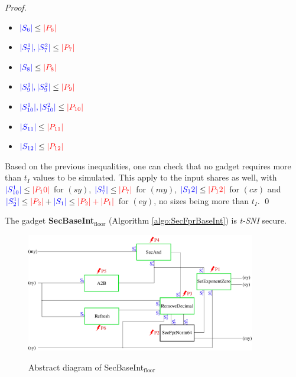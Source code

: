 \documentclass[runningheads]{llncs}
\begin{document}
\begin{proof}
\begin{multicols}{2}
\begin{itemize}
      \item $\textcolor{blue}{|S_6|} \leq \textcolor{red}{|P_6|}$
      \item $\textcolor{blue}{|S_7^1|,|S_7^2|} \leq \textcolor{red}{|P_7|}$
      \item $\textcolor{blue}{|S_8|} \leq \textcolor{red}{|P_8|}$
      \item $\textcolor{blue}{|S_9^1|,|S_9^2|} \leq \textcolor{red}{|P_9|}$
      \item $\textcolor{blue}{|S_{10}^1|,|S_{10}^2|} \leq \textcolor{red}{|P_{10}|}$
      \item $\textcolor{blue}{|S_{11}|} \leq \textcolor{red}{|P_{11}|}$
      \item $\textcolor{blue}{|S_{12}|} \leq \textcolor{red}{|P_{12}|}$
    \end{itemize}
  \end{multicols}
  Based on the previous inequalities, one can check that no gadget requires more than $t_I$ values to be simulated. This apply to the input shares as well, with $\textcolor{blue}{|S_{10}^1|}\leq\textcolor{red}{|P_10|}$ for $(sy)$, $\textcolor{blue}{|S_7^1|}\leq\textcolor{red}{|P_7|}$ for $(my)$, $\textcolor{blue}{|S_12|} \leq \textcolor{red}{|P_12|}$ for $(cx)$ and $\textcolor{blue}{|S_2^1|}\leq\textcolor{red}{|P_2|} + \textcolor{blue}{|S_1|} \leq \textcolor{red}{|P_2| + |P_1|}$ for $(ey)$, no sizes being more than $t_I$. \hfill \qed
\end{proof}

\begin{theorem}
  The gadget \textbf{SecBaseInt$_\text{floor}$} (Algorithm \ref{algo:SecFprBaseInt}) is \emph{t-SNI} secure.
\end{theorem}

\begin{figure}[ht]
  \centering
  \includegraphics[width=10cm]{figure/secbaseint2.pdf}
  \label{fig:secbaseint}
  \caption{Abstract diagram of SecBaseInt$_\text{floor}$}
\end{figure}
\end{document}
